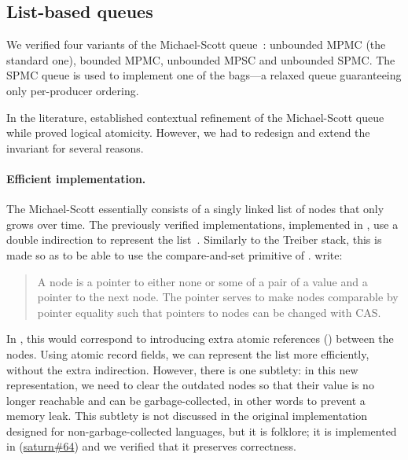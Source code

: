 \subsection{List-based queues}

We verified four variants of the Michael-Scott queue~\citep*{DBLP:conf/podc/MichaelS96}: unbounded MPMC (the standard one), bounded MPMC, unbounded MPSC and unbounded SPMC.
The SPMC queue is used to implement one of the bags---a relaxed queue guaranteeing only per-producer ordering.

In the \Iris literature, \citet*{DBLP:conf/cpp/VindumB21} established contextual refinement of the Michael-Scott queue while \citet*{DBLP:journals/pacmpl/MulderK23} proved logical atomicity.
However, we had to redesign and extend the invariant for several reasons.

\paragraph{Efficient implementation.}\label{par:michael-scott-cleanup}
The Michael-Scott essentially consists of a singly linked list of nodes that only grows over time.
The previously verified implementations, implemented in \HeapLang, use a double indirection to represent the list~\citep*[\figurename~2]{DBLP:conf/cpp/VindumB21}.
Similarly to the Treiber stack, this is made so as to be able to use the compare-and-set primitive of \HeapLang. \citet*{DBLP:conf/cpp/VindumB21} write:
\begin{quotation}
  A node is a pointer to either none or some of a pair of a value and a pointer to the next node.
  The pointer serves to make nodes comparable by pointer equality such that pointers to nodes can be changed with CAS.
\end{quotation}
In \OCaml, this would correspond to introducing extra atomic references () between the nodes.
Using atomic record fields, we can represent the list more efficiently, without the extra indirection.
However, there is one subtlety: in this new representation, we need to clear the outdated nodes so that their value is no longer reachable and can be garbage-collected, in other words to prevent a memory leak.
This subtlety is not discussed in the original implementation~\citep*{DBLP:conf/podc/MichaelS96} designed for non-garbage-collected languages, but it is folklore; it is implemented in \Saturn (\href{https://github.com/ocaml-multicore/saturn/pull/64}{saturn\#64}) and we verified that it preserves correctness.

